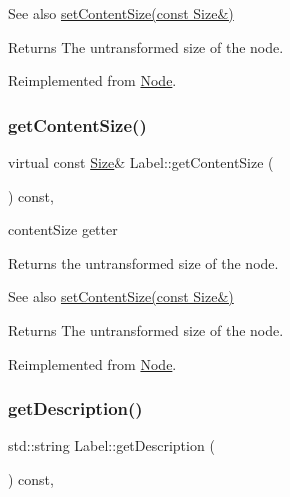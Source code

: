 \begin{DoxySeeAlso}{See also}
{\ttfamily \hyperlink{classNode_ade113d7fc9244f58ac98a4712da49818}{set\+Content\+Size(const Size\&)}}
\end{DoxySeeAlso}
\begin{DoxyReturn}{Returns}
The untransformed size of the node. 
\end{DoxyReturn}


Reimplemented from \hyperlink{classNode_a3828836a62dbf0862ecaa99a72babc13}{Node}.

\mbox{\label{classLabel_a6ff9d78705856ffaf4b5258682e1df00}} 
\subsubsection{\texorpdfstring{get\+Content\+Size()}{getContentSize()}\hspace{0.1cm}{\footnotesize\ttfamily [2/2]}}
{\footnotesize\ttfamily virtual const \hyperlink{classSize}{Size}\& Label\+::get\+Content\+Size (\begin{DoxyParamCaption}{ }\end{DoxyParamCaption}) const\hspace{0.3cm}{\ttfamily [override]}, {\ttfamily [virtual]}}



content\+Size getter 

Returns the untransformed size of the node.

\begin{DoxySeeAlso}{See also}
{\ttfamily \hyperlink{classNode_ade113d7fc9244f58ac98a4712da49818}{set\+Content\+Size(const Size\&)}}
\end{DoxySeeAlso}
\begin{DoxyReturn}{Returns}
The untransformed size of the node. 
\end{DoxyReturn}


Reimplemented from \hyperlink{classNode_a3828836a62dbf0862ecaa99a72babc13}{Node}.

\mbox{\label{classLabel_ab4b264b43169b883b12043b5a860e901}} 
\subsubsection{\texorpdfstring{get\+Description()}{getDescription()}\hspace{0.1cm}{\footnotesize\ttfamily [1/2]}}
{\footnotesize\ttfamily std\+::string Label\+::get\+Description (\begin{DoxyParamCaption}{ }\end{DoxyParamCaption}) const\hspace{0.3cm}{\ttfamily [override]}, {\ttfamily [virtual]}}

